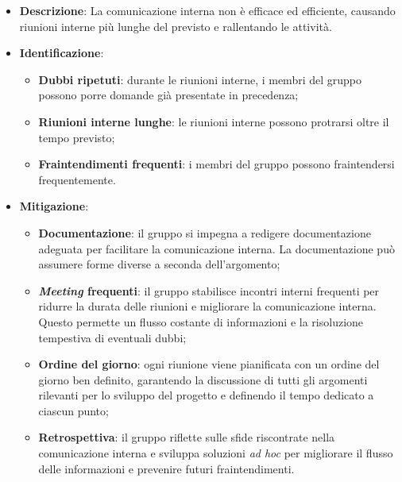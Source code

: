 \label{risk:comunicazione interna carente}
\begin{itemize}
	\item \textbf{Descrizione}:
	      La comunicazione interna non è efficace ed efficiente, causando riunioni
	      interne più lunghe del previsto e rallentando le attività.
	\item \textbf{Identificazione}:
	      \begin{itemize}
		      \item \textbf{Dubbi ripetuti}: durante le riunioni interne, i
		            membri del gruppo possono porre domande già presentate in
		            precedenza;

		      \item \textbf{Riunioni interne lunghe}: le riunioni interne
		            possono protrarsi oltre il tempo previsto;

		      \item \textbf{Fraintendimenti frequenti}: i membri del gruppo
		            possono fraintendersi frequentemente.

	      \end{itemize}
	\item \textbf{Mitigazione}:
	      \begin{itemize}
		      \item \textbf{Documentazione}: il gruppo si impegna a redigere 
			  		documentazione adeguata per facilitare la comunicazione interna. 
					La documentazione può assumere forme diverse a seconda dell'argomento;

		      \item \textbf{\textit{Meeting} frequenti}: il gruppo stabilisce incontri interni 
			  		frequenti per ridurre la durata delle riunioni e migliorare la comunicazione 
					interna. Questo permette un flusso costante di informazioni e la risoluzione 
					tempestiva di eventuali dubbi;

		      \item \textbf{Ordine del giorno}: ogni riunione viene pianificata con un ordine 
			  		del giorno ben definito, garantendo la discussione di tutti gli argomenti 
					rilevanti per lo sviluppo del progetto e definendo il tempo dedicato a 
					ciascun punto;

		      \item \textbf{Retrospettiva}: il gruppo riflette sulle sfide riscontrate nella 
			  		comunicazione interna e sviluppa soluzioni \textit{ad hoc} per migliorare 
					il flusso delle informazioni e prevenire futuri fraintendimenti.
	      \end{itemize}


\end{itemize}
